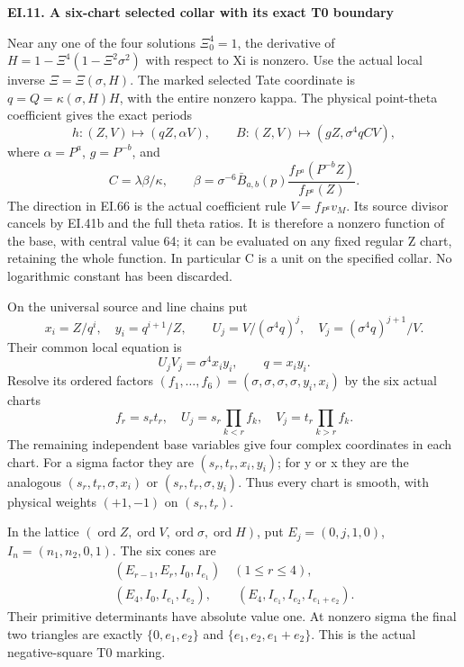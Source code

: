 \par

\medskip\noindent\textbf{EI.11. A six-chart selected collar with its exact T0 boundary}

\par\nobreak

Near any one of the four solutions \(\Xi_0^4=1\), the derivative
of \(H=1-\Xi^4(1-\Xi^2\sigma^2)\) with respect to Xi is nonzero.
Use the actual local inverse \(\Xi=\Xi(\sigma,H)\). The marked
selected Tate coordinate is \(q=Q=\kappa(\sigma,H)H\), with the
entire nonzero kappa. The physical point-theta coefficient gives
the exact periods
\[
 h:(Z,V)\mapsto(qZ,\alpha V),\qquad
 B:(Z,V)\mapsto(gZ,\sigma^4q C V),
 \tag{EI.65}
\]
where \(\alpha=P^a\), \(g=P^{-b}\), and
\[
 C=\lambda\beta/\kappa,\qquad
 \beta=\sigma^{-6}\bar B_{a,b}(p)
       \frac{f_{P^a}(P^{-b}Z)}{f_{P^a}(Z)}.
 \tag{EI.66}
\]
The direction in EI.66 is the actual coefficient rule
\(V=f_{P^a}v_M\). Its source divisor cancels by EI.41b and the
full theta ratios. It is therefore a nonzero function of the base,
with central value 64; it can be evaluated on any fixed regular
Z chart, retaining the whole function. In particular C is a unit
on the specified collar. No logarithmic constant has been discarded.

On the universal source and line chains put
\[
 x_i=Z/q^i,\quad y_i=q^{i+1}/Z,\qquad
 U_j=V/(\sigma^4q)^j,\quad
 V_j=(\sigma^4q)^{j+1}/V.
 \tag{EI.67}
\]
Their common local equation is
\[
 U_jV_j=\sigma^4x_i y_i,\qquad q=x_i y_i.
 \tag{EI.68}
\]
Resolve its ordered factors
\((f_1,\ldots,f_6)=(\sigma,\sigma,\sigma,\sigma,y_i,x_i)\)
by the six actual charts
\[
 f_r=s_rt_r,\quad
 U_j=s_r\prod_{k<r}f_k,\quad
 V_j=t_r\prod_{k>r}f_k.
 \tag{EI.69}
\]
The remaining independent base variables give four complex
coordinates in each chart. For a sigma factor they are
\((s_r,t_r,x_i,y_i)\); for y or x they are the analogous
\((s_r,t_r,\sigma,x_i)\) or
\((s_r,t_r,\sigma,y_i)\). Thus every chart is smooth, with
physical weights \((+1,-1)\) on \((s_r,t_r)\).

In the lattice \((\operatorname{ord}Z,\operatorname{ord}V,
\operatorname{ord}\sigma,\operatorname{ord}H)\), put
\(E_j=(0,j,1,0)\), \(I_n=(n_1,n_2,0,1)\).
The six cones are
\[
 \begin{gathered}
 (E_{r-1},E_r,I_0,I_{e_1})\quad(1\le r\le4),\\
 (E_4,I_0,I_{e_1},I_{e_2}),\qquad
 (E_4,I_{e_1},I_{e_2},I_{e_1+e_2}).
\end{gathered}
 \tag{EI.70}
\]
Their primitive determinants have absolute value one. At nonzero
sigma the final two triangles are exactly
\(\{0,e_1,e_2\}\) and \(\{e_1,e_2,e_1+e_2\}\).
This is the actual negative-square T0 marking.

